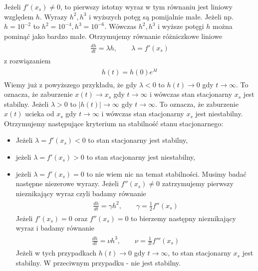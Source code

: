 \documentclass[a4paper,12pt,polish]{sphinxmanual}
\begin{document}
Jeżeli $f'(x_s) \ne 0$, to pierwszy istotny wyraz w tym równaniu jest liniowy
względem $h$.  Wyrazy $h^2,  h^3$ i wyższych potęg są pomijalnie małe.
Jeżeli np. $h =10^{-2}$ to  $h^2 = 10^{-4},  h^3 = 10^{-6}$. Wówczas
$h^2,  h^3$ i wyższe potęgi $h$  można pominąć jako bardzo małe.
Otrzymujemy równanie różniczkowe liniowe
\label{ch1/chI023:equation-eqn14}\begin{gather}
\begin{split}\frac{dh}{dt} =\lambda h, \qquad \lambda = f'(x_s)\end{split}\label{ch1/chI023-eqn14}
\end{gather}
z rozwiązaniem
\label{ch1/chI023:equation-eqn15}\begin{gather}
\begin{split}h(t) = h(0)  e^{\lambda t}\end{split}\label{ch1/chI023-eqn15}
\end{gather}
Wiemy już z powyższego przykładu, że gdy $\lambda < 0$ to $h(t) \to 0$ gdy $t\to \infty$. To oznacza, że  zaburzenie $x(t) \to x_s$ gdy  $t \to \infty$  i wówczas stan stacjonarny $x_s$ jest stabilny.  Jeżeli  $\lambda > 0$ to $|h(t)| \to \infty$ gdy $t\to \infty$. To oznacza, że  zaburzenie $x(t)$ ucieka od $x_s$ gdy  $t \to \infty$  i wówczas stan stacjonarny $x_s$ jest niestabilny. Otrzymujemy następujące kryterium na stabilność stanu stacjonarnego:
\begin{itemize}
\item {} 
Jeżeli $\lambda = f'(x_s) < 0$ to  stan stacjonarny jest stabilny,

\item {} 
jeżeli $\lambda = f'(x_s) > 0$ to  stan stacjonarny jest niestabilny,

\item {} 
jeżeli $\lambda = f'(x_s) = 0$ to  nie wiem nic na temat stabilności. Musimy badać następne niezerowe wyrazy.  Jeżeli $f''(x_s) \ne 0$ zatrzymujemy pierwszy nieznikający wyraz czyli  badamy równanie
\label{ch1/chI023:equation-eqn16}\begin{gather}
\begin{split}\frac{dh}{dt} =\gamma h^2, \qquad \gamma  =  \frac{1}{2}f''(x_s)\end{split}\label{ch1/chI023-eqn16}
\end{gather}
Jeżeli  $f'(x_s) =0$ oraz $f''(x_s) =0$ to  bierzemy następny nieznikający wyraz i badamy równanie
\label{ch1/chI023:equation-eqn17}\begin{gather}
\begin{split} \frac{dh}{dt} =\nu h^3, \qquad \nu  =    \frac{1}{3!} f'''(x_s)\end{split}\label{ch1/chI023-eqn17}
\end{gather}
Jeżeli w tych przypadkach $h(t) \to 0$ gdy $t\to \infty$, to  stan stacjonarny $x_s$ jest stabilny. W przeciwnym przypadku  - nie jest stabilny.

\end{itemize}
\end{document}
